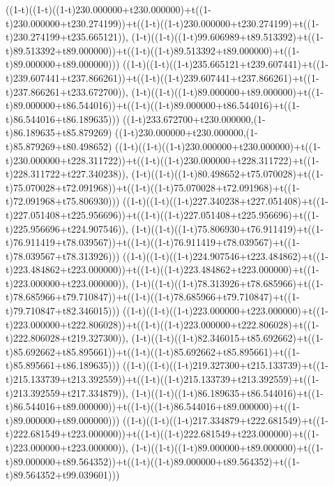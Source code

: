 ((1-t)((1-t)((1-t)230.000000+t230.000000)+t((1-t)230.000000+t230.274199))+t((1-t)((1-t)230.000000+t230.274199)+t((1-t)230.274199+t235.665121)),                                     (1-t)((1-t)((1-t)99.606989+t89.513392)+t((1-t)89.513392+t89.000000))+t((1-t)((1-t)89.513392+t89.000000)+t((1-t)89.000000+t89.000000)))
((1-t)((1-t)((1-t)235.665121+t239.607441)+t((1-t)239.607441+t237.866261))+t((1-t)((1-t)239.607441+t237.866261)+t((1-t)237.866261+t233.672700)),                                     (1-t)((1-t)((1-t)89.000000+t89.000000)+t((1-t)89.000000+t86.544016))+t((1-t)((1-t)89.000000+t86.544016)+t((1-t)86.544016+t86.189635)))
((1-t)233.672700+t230.000000,(1-t)86.189635+t85.879269)
((1-t)230.000000+t230.000000,(1-t)85.879269+t80.498652)
((1-t)((1-t)((1-t)230.000000+t230.000000)+t((1-t)230.000000+t228.311722))+t((1-t)((1-t)230.000000+t228.311722)+t((1-t)228.311722+t227.340238)),                                     (1-t)((1-t)((1-t)80.498652+t75.070028)+t((1-t)75.070028+t72.091968))+t((1-t)((1-t)75.070028+t72.091968)+t((1-t)72.091968+t75.806930)))
((1-t)((1-t)((1-t)227.340238+t227.051408)+t((1-t)227.051408+t225.956696))+t((1-t)((1-t)227.051408+t225.956696)+t((1-t)225.956696+t224.907546)),                                     (1-t)((1-t)((1-t)75.806930+t76.911419)+t((1-t)76.911419+t78.039567))+t((1-t)((1-t)76.911419+t78.039567)+t((1-t)78.039567+t78.313926)))
((1-t)((1-t)((1-t)224.907546+t223.484862)+t((1-t)223.484862+t223.000000))+t((1-t)((1-t)223.484862+t223.000000)+t((1-t)223.000000+t223.000000)),                                     (1-t)((1-t)((1-t)78.313926+t78.685966)+t((1-t)78.685966+t79.710847))+t((1-t)((1-t)78.685966+t79.710847)+t((1-t)79.710847+t82.346015)))
((1-t)((1-t)((1-t)223.000000+t223.000000)+t((1-t)223.000000+t222.806028))+t((1-t)((1-t)223.000000+t222.806028)+t((1-t)222.806028+t219.327300)),                                     (1-t)((1-t)((1-t)82.346015+t85.692662)+t((1-t)85.692662+t85.895661))+t((1-t)((1-t)85.692662+t85.895661)+t((1-t)85.895661+t86.189635)))
((1-t)((1-t)((1-t)219.327300+t215.133739)+t((1-t)215.133739+t213.392559))+t((1-t)((1-t)215.133739+t213.392559)+t((1-t)213.392559+t217.334879)),                                     (1-t)((1-t)((1-t)86.189635+t86.544016)+t((1-t)86.544016+t89.000000))+t((1-t)((1-t)86.544016+t89.000000)+t((1-t)89.000000+t89.000000)))
((1-t)((1-t)((1-t)217.334879+t222.681549)+t((1-t)222.681549+t223.000000))+t((1-t)((1-t)222.681549+t223.000000)+t((1-t)223.000000+t223.000000)),                                     (1-t)((1-t)((1-t)89.000000+t89.000000)+t((1-t)89.000000+t89.564352))+t((1-t)((1-t)89.000000+t89.564352)+t((1-t)89.564352+t99.039601)))
